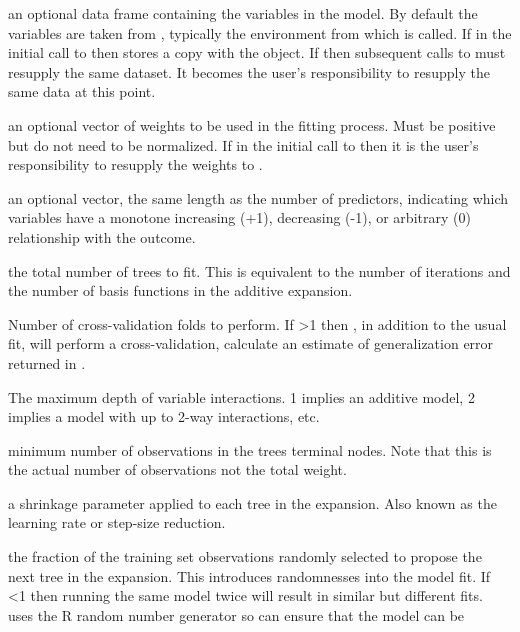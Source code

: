 \begin{Arguments}
\begin{ldescription}
\item[\code{data}] an optional data frame containing the variables in the model. By
default the variables are taken from , typically 
the environment from which  is called. If  in 
the initial call to  then  stores a copy with the 
object. If  then subsequent calls to 
 must resupply the same dataset. It becomes the user's 
responsibility to resupply the same data at this point.
\item[\code{weights}] an optional vector of weights to be used in the fitting process. 
Must be positive but do not need to be normalized. If  
in the initial call to  then it is the user's responsibility to 
resupply the weights to .
\item[\code{var.monotone}] an optional vector, the same length as the number of
predictors, indicating which variables have a monotone increasing (+1),
decreasing (-1), or arbitrary (0) relationship with the outcome.
\item[\code{n.trees}] the total number of trees to fit. This is equivalent to the
number of iterations and the number of basis functions in the additive
expansion.
\item[\code{cv.folds}] Number of cross-validation folds to perform. If >1 then
, in addition to the usual fit, will perform a cross-validation, calculate
an estimate of generalization error returned in .
\item[\code{interaction.depth}] The maximum depth of variable interactions. 1 implies
an additive model, 2 implies a model with up to 2-way interactions, etc.
\item[\code{n.minobsinnode}] minimum number of observations in the trees terminal
nodes. Note that this is the actual number of observations not the total
weight.
\item[\code{shrinkage}] a shrinkage parameter applied to each tree in the expansion.
Also known as the learning rate or step-size reduction.
\item[\code{bag.fraction}] the fraction of the training set observations randomly
selected to propose the next tree in the expansion. This introduces randomnesses
into the model fit. If <1 then running the same model twice
will result in similar but different fits.  uses the R random number
generator so  can ensure that the model can be

\end{ldescription}
\end{Arguments}
